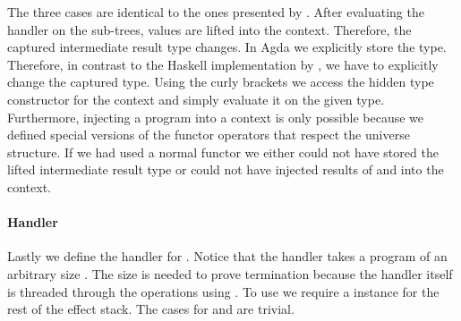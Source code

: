 The three cases are identical to the ones presented by
\textcite{DBLP:conf/haskell/WuSH14}.
After evaluating the handler on the sub-trees, values are lifted into the
context.
Therefore, the captured intermediate result type changes.
In Agda we explicitly store the type.
Therefore, in contrast to the Haskell implementation by
\textcite{DBLP:conf/haskell/WuSH14}, we have to explicitly change the captured
type.
Using the curly brackets we access the hidden type constructor 
for the context and simply evaluate it on the given type.
Furthermore, injecting a program into a context is only possible because we
defined special versions of the functor operators that respect the universe
structure.
If we had used a normal functor we either could not have stored the lifted
intermediate result type or could not have injected results of 
and  into the context.

\paragraph{Handler}
Lastly we define the handler for .
Notice that the handler takes a program of an arbitrary size
.
The size is needed to prove termination because the handler itself is threaded
through the  operations using
.
To use  we require a  instance for the
rest of the effect stack.
The cases for  and
 are trivial.

